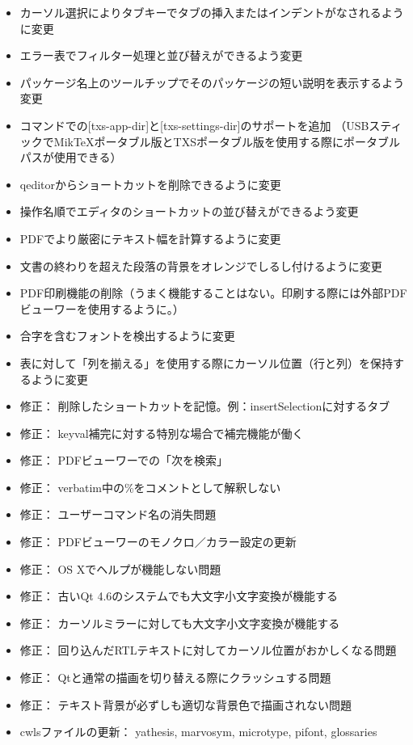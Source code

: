 \begin{itemize}
\item
  カーソル選択によりタブキーでタブの挿入またはインデントがなされるように変更
\item
  エラー表でフィルター処理と並び替えができるよう変更
\item
  パッケージ名上のツールチップでそのパッケージの短い説明を表示するよう変更
\item
  コマンドでの{[}txs-app-dir{]}と{[}txs-settings-dir{]}のサポートを追加
  （USBスティックでMikTeXポータブル版とTXSポータブル版を使用する際にポータブルパスが使用できる）
\item
  qeditorからショートカットを削除できるように変更
\item
  操作名順でエディタのショートカットの並び替えができるよう変更
\item
  PDFでより厳密にテキスト幅を計算するように変更
\item
  文書の終わりを超えた段落の背景をオレンジでしるし付けるように変更
\item
  PDF印刷機能の削除（うまく機能することはない。印刷する際には外部PDFビューワーを使用するように。）
\item
  合字を含むフォントを検出するように変更
\item
  表に対して「列を揃える」を使用する際にカーソル位置（行と列）を保持するように変更
\item
  修正： 削除したショートカットを記憶。例：insertSelectionに対するタブ
\item
  修正： keyval補完に対する特別な場合で補完機能が働く
\item
  修正： PDFビューワーでの「次を検索」
\item
  修正： verbatim中の\%をコメントとして解釈しない
\item
  修正： ユーザーコマンド名の消失問題
\item
  修正： PDFビューワーのモノクロ／カラー設定の更新
\item
  修正： OS Xでヘルプが機能しない問題
\item
  修正： 古いQt 4.6のシステムでも大文字小文字変換が機能する
\item
  修正： カーソルミラーに対しても大文字小文字変換が機能する
\item
  修正： 回り込んだRTLテキストに対してカーソル位置がおかしくなる問題
\item
  修正： Qtと通常の描画を切り替える際にクラッシュする問題
\item
  修正： テキスト背景が必ずしも適切な背景色で描画されない問題
\item
  cwlsファイルの更新： yathesis, marvosym, microtype, pifont, glossaries
\end{itemize}

